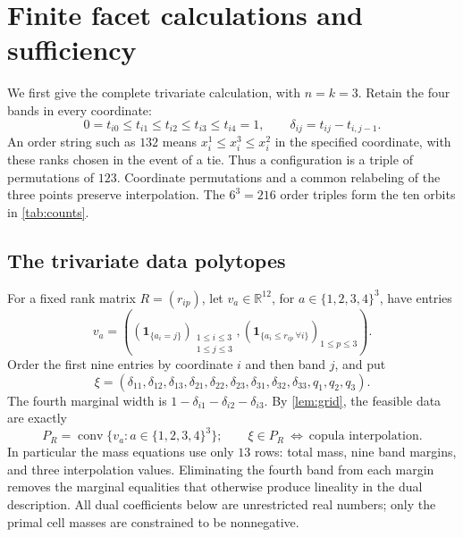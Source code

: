 \documentclass[a4paper,11pt]{amsart}
\numberwithin{equation}{section}
\theoremstyle{definition}
\theoremstyle{remark}
\newcommand{\R}{\mathbb R}
\begin{document}
\section{Finite facet calculations and sufficiency}\label{sec:configurations}
We first give the complete trivariate calculation, with $n=k=3$. Retain the four bands in every coordinate:
\[
 0=t_{i0}\leq t_{i1}\leq t_{i2}\leq t_{i3}\leq t_{i4}=1,
 \qquad \delta_{ij}=t_{ij}-t_{i,j-1}.
\]
An order string such as $132$ means
$x_i^1\leq x_i^3\leq x_i^2$ in the specified coordinate, with these ranks
chosen in the event of a tie. Thus a configuration is a triple of
permutations of $123$. Coordinate permutations and a common relabeling of
the three points preserve interpolation. The $6^3=216$ order triples form
the ten orbits in \cref{tab:counts}.

\subsection{The trivariate data polytopes}
For a fixed rank matrix $R=(r_{ip})$, let $v_a\in\R^{12}$, for
$a\in\{1,2,3,4\}^3$, have entries
\begin{equation}
 v_a=\left(
   (\boldsymbol{1}_{\{a_i=j\}})_{\substack{1\leq i\leq3\\1\leq j\leq3}},
   (\boldsymbol{1}_{\{a_i\leq r_{ip}\ \forall i\}})_{1\leq p\leq3}
       \right).\label{eq:vertices}
\end{equation}
Order the first nine entries by coordinate $i$ and then band $j$, and put
\begin{equation}
 \xi=(\delta_{11},\delta_{12},\delta_{13},
       \delta_{21},\delta_{22},\delta_{23},
       \delta_{31},\delta_{32},\delta_{33},q_1,q_2,q_3).
 \label{eq:z}
\end{equation}
The fourth marginal width is $1-\delta_{i1}-\delta_{i2}-\delta_{i3}$.
By \cref{lem:grid}, the feasible data are exactly
\begin{equation}
 P_R=\operatorname{conv}\{v_a:a\in\{1,2,3,4\}^3\};
 \qquad \xi\in P_R\ \Longleftrightarrow\ \text{copula interpolation}.
 \label{eq:polytope}
\end{equation}
In particular the mass equations use only $13$ rows: total mass, nine
band margins, and three interpolation values. Eliminating the fourth
band from each margin removes the marginal equalities that otherwise
produce lineality in the dual description.
All dual coefficients below are unrestricted real numbers; only the
primal cell masses are constrained to be nonnegative.
\end{document}
